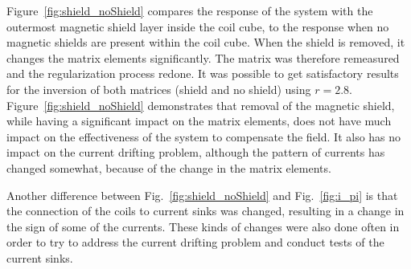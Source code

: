 
Figure~\ref{fig:shield_noShield} compares the response of the system
with the outermost magnetic shield layer inside the coil cube, to the
response when no magnetic shields are present within the coil cube.
When the shield is removed, it changes the matrix elements
significantly. The matrix was therefore remeasured and the
regularization process redone.  It was possible to get satisfactory
results for the inversion of both matrices (shield and no shield)
using $r=2.8$.  Figure~\ref{fig:shield_noShield} demonstrates that
removal of the magnetic shield, while having a significant impact on
the matrix elements, does not have much impact on the effectiveness of
the system to compensate the field.  It also has no impact on the
current drifting problem, although the pattern of currents has changed
somewhat, because of the change in the matrix elements.

Another difference between Fig.~\ref{fig:shield_noShield} and
Fig.~\ref{fig:i_pi} is that the connection of the coils to current
sinks was changed, resulting in a change in the sign of some of the
currents.  These kinds of changes were also done often in order to try
to address the current drifting problem and conduct tests of the
current sinks.





